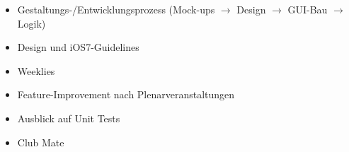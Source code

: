 \begin{itemize}
	\item Gestaltungs-/Entwicklungsprozess (Mock-ups $\to$ Design $\to$ GUI-Bau $\to$ Logik)
	\item Design und iOS7-Guidelines
	\item Weeklies
	\item Feature-Improvement nach Plenarveranstaltungen
	\item Ausblick auf Unit Tests
	\item Club Mate
\end{itemize}
